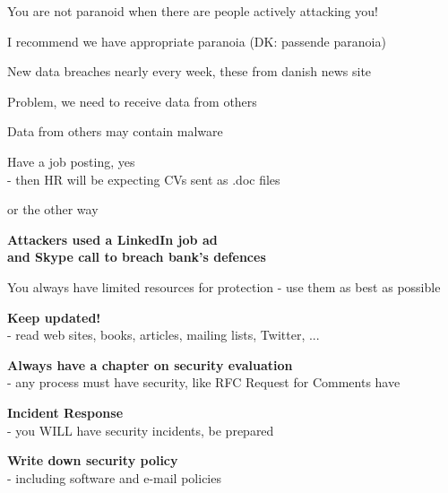 \documentclass[Screen16to9,17pt]{foils}
\begin{document}
\vskip 1cm
\centerline{You are not paranoid when there are people actively attacking you!}

I recommend we have appropriate paranoia (DK: passende paranoia)





New data breaches nearly every week, these from danish news site 

Problem, we need to receive data from others

Data from others may contain malware

Have a job posting, yes\\
- then HR will be expecting CVs sent as .doc files

\slide{}

or the other way

{\Large\bf Attackers used a LinkedIn job ad\\
and Skype call to breach bank’s defences}

{\footnotesize
{}}




\begin{list1}
\item You always have limited resources for protection - use them as best as possible
\end{list1}




\begin{list1}
\item {\bf Keep updated!}\\ - read web sites, books, articles, mailing lists, Twitter, ...
\item {\bf Always have a chapter on security evaluation }\\ - any process must have security, like RFC Request for Comments have
\item {\bf Incident Response}\\ - you WILL have security incidents, be prepared
\item {\bf Write down security policy}\\ - including software and e-mail policies
\end{list1}
\end{document}
